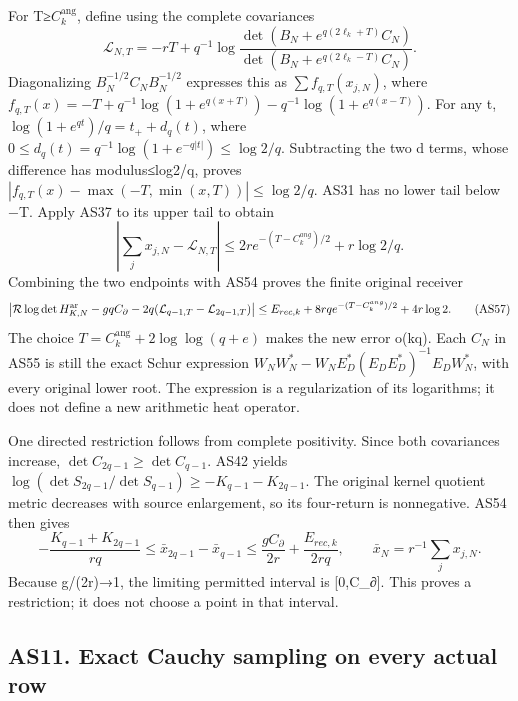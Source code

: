 \documentclass[11pt]{article}
\begin{document}
For T≥\(C_k^{\mathrm{ang}}\), define using the complete covariances \[
\mathcal L_{N,T}=-rT+q^{-1}\log
\frac{\det(B_N+e^{q(2\ell_k+T)}C_N)}
{\det(B_N+e^{q(2\ell_k-T)}C_N)}.
\tag{AS55}
\] Diagonalizing \(B_N^{-1/2}C_NB_N^{-1/2}\) expresses this as \(\sum f_{q,T}(x_{j,N})\), where \(f_{q,T}(x)=-T+q^{-1}\log(1+e^{q(x+T)})-q^{-1}\log(1+e^{q(x-T)})\). For any t, \(\log(1+e^{qt})/q=t_++d_q(t)\), where \(0\le d_q(t)=q^{-1}\log(1+e^{-q|t|})\le\log2/q\). Subtracting the two d terms, whose difference has modulus≤log2/q, proves \(|f_{q,T}(x)-\max(-T,\min(x,T))|\le\log2/q\). AS31 has no lower tail below −T. Apply AS37 to its upper tail to obtain \[
\left|\sum_jx_{j,N}-\mathcal L_{N,T}\right|
\le2r e^{-(T-C_k^{ang})/2}+r\log2/q.
\tag{AS56}
\] Combining the two endpoints with AS54 proves the finite original receiver \[
\left|\mathcal R\log\det H_{K,N}^{\rm ar}-gqC_\partial
-2q(\mathcal L_{q-1,T}-\mathcal L_{2q-1,T})\right|
\le E_{rec,k}+8rq e^{-(T-C_k^{ang})/2}+4r\log2.
\tag{AS57}
\] The choice \(T=C_k^{\mathrm{ang}}+2\log\log(q+e)\) makes the new error o(kq). Each \(C_N\) in AS55 is still the exact Schur expression \(W_NW_N^*-W_NE_D^*(E_DE_D^*)^{-1}E_DW_N^*\), with every original lower root. The expression is a regularization of its logarithms; it does not define a new arithmetic heat operator.

One directed restriction follows from complete positivity. Since both covariances increase, \(\det C_{2q-1}\ge\det C_{q-1}\). AS42 yields \(\log(\det S_{2q-1}/\det S_{q-1})\ge-K_{q-1}-K_{2q-1}\). The original kernel quotient metric decreases with source enlargement, so its four-return is nonnegative. AS54 then gives \[
-\frac{K_{q-1}+K_{2q-1}}{rq}
\le\bar x_{2q-1}-\bar x_{q-1}
\le\frac{gC_\partial}{2r}+\frac{E_{rec,k}}{2rq},
\qquad\bar x_N=r^{-1}\sum_jx_{j,N}.
\tag{AS58}
\] Because g/(2r)→1, the limiting permitted interval is {[}0,C\_∂{]}. This proves a restriction; it does not choose a point in that interval.

\subsection{AS11. Exact Cauchy sampling on every actual row}\label{as11.-exact-cauchy-sampling-on-every-actual-row}
\end{document}
